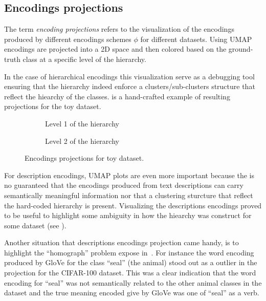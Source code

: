 \subsection{Encodings projections}
\label{subsec:encodings-projections}
The term \emph{encoding projections} refers to the visualization of the encodings produced by different encodings schemes $\phi$ for different datasets. Using UMAP encodings are projected into a 2D space and then colored based on the ground-truth class at a specific level of the hierarchy.

In the case of hierarchical encodings this visualization serve as a debugging tool ensuring that the hierarchy indeed enforce a clusters/sub-clusters structure that reflect the hiearchy of the classes.  is a hand-crafted example of resulting projections for the toy dataset.

\begin{figure}[h]
  \centering
  \begin{subfigure}{0.45\textwidth}
    \caption{Level 1 of the hierarchy}
    \label{fig:04/hierarchical-encodings-projections-lvl1}
  \end{subfigure}
  \begin{subfigure}{0.45\textwidth}
    \caption{Level 2 of the hierarchy}
    \label{fig:04/hierarchical-encodings-projections-lvl2}
  \end{subfigure}
  \caption{Encodings projections for toy dataset.}
  \label{fig:04/hierarchical-encodings-projections}
\end{figure}

For description encodings, UMAP plots are even more important because the is no guaranteed that the encodings produced from text descriptions can carry semantically meaningful information nor that a clustering sturcture that reflect the hard-coded hierarchy is present. Visualizing the descriptions encodings proved to be useful to highlight some ambiguity in how the hiearchy was construct for some dataset (see ).

Another situation that descriptions encodings projection came handy, is to highlight the ``homograph'' problem expose in~. For instance the word encoding produced by GloVe for the class ``seal'' (the animal) stood out as a outlier in the projection for the CIFAR-100 dataset. This was a clear indication that the word encoding for ``seal'' was not semantically related to the other animal classes in the dataset and the true meaning encoded give by GloVe was one of ``seal'' as a verb.


